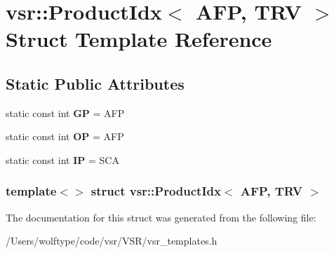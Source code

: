 \hypertarget{structvsr_1_1_product_idx_3_01_a_f_p_00_01_t_r_v_01_4}{\section{vsr\-:\-:Product\-Idx$<$ A\-F\-P, T\-R\-V $>$ Struct Template Reference}
\label{structvsr_1_1_product_idx_3_01_a_f_p_00_01_t_r_v_01_4}
}
\subsection*{Static Public Attributes}
\begin{DoxyCompactItemize}
\item 
\hypertarget{structvsr_1_1_product_idx_3_01_a_f_p_00_01_t_r_v_01_4_a232570853f508b52bd62eba324a9b96d}{static const int {\bfseries G\-P} = A\-F\-P}\label{structvsr_1_1_product_idx_3_01_a_f_p_00_01_t_r_v_01_4_a232570853f508b52bd62eba324a9b96d}

\item 
\hypertarget{structvsr_1_1_product_idx_3_01_a_f_p_00_01_t_r_v_01_4_a733345924505089d88c22a14b9ee7c41}{static const int {\bfseries O\-P} = A\-F\-P}\label{structvsr_1_1_product_idx_3_01_a_f_p_00_01_t_r_v_01_4_a733345924505089d88c22a14b9ee7c41}

\item 
\hypertarget{structvsr_1_1_product_idx_3_01_a_f_p_00_01_t_r_v_01_4_a29594ef28b0918728f5f2bccaf50bfa6}{static const int {\bfseries I\-P} = S\-C\-A}\label{structvsr_1_1_product_idx_3_01_a_f_p_00_01_t_r_v_01_4_a29594ef28b0918728f5f2bccaf50bfa6}

\end{DoxyCompactItemize}
\subsubsection*{template$<$$>$ struct vsr\-::\-Product\-Idx$<$ A\-F\-P, T\-R\-V $>$}



The documentation for this struct was generated from the following file\-:\begin{DoxyCompactItemize}
\item 
/\-Users/wolftype/code/vsr/\-V\-S\-R/vsr\-\_\-templates.\-h\end{DoxyCompactItemize}
